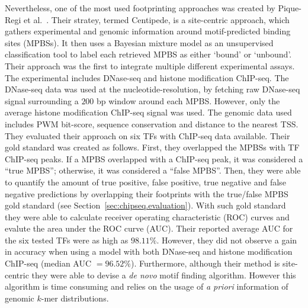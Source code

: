 Nevertheless, one of the most used footprinting approaches was created by Pique-Regi et al.~\cite{pique2011}. Their stratey, termed Centipede, is a site-centric approach, which gathers experimental and genomic information around motif-predicted binding sites (MPBSs). It then uses a Bayesian mixture model as an unsupervised classification tool to label each retrieved MPBS as either `bound' or `unbound'. Their approach was the first to integrate multiple different experimental assays. The experimental includes DNase-seq and histone modification ChIP-seq. The DNase-seq data was used at the nucleotide-resolution, by fetching raw DNase-seq signal surrounding a $200$ bp window around each MPBS. However, only the average histone modification ChIP-seq signal was used. The genomic data used includes PWM bit-score, sequence conservation and distance to the nearest TSS. They evaluated their approach on six TFs with ChIP-seq data available. Their gold standard was created as follows. First, they overlapped the MPBSs with TF ChIP-seq peaks. If a MPBS overlapped with a ChIP-seq peak, it was considered a ``true MPBS''; otherwise, it was considered a ``false MPBS''. Then, they were able to quantify the amount of true positive, false positive, true negative and false negative predictions by overlapping their footprints with the true/false MPBS gold standard (see Section~\ref{sec:chipseq.evaluation}). With such gold standard they were able to calculate receiver operating characteristic (ROC) curves and evalute the area under the ROC curve (AUC). Their reported average AUC for the six tested TFs were as high as $98.11\%$. However, they did not observe a gain in accuracy when using a model with both DNase-seq and histone modification ChIP-seq (median AUC $= 96.52\%$). Furthermore, although their method is site-centric they were able to devise a \emph{de novo} motif finding algorithm. However this algorithm is time consuming and relies on the usage of \emph{a priori} information of genomic $k$-mer distributions.

